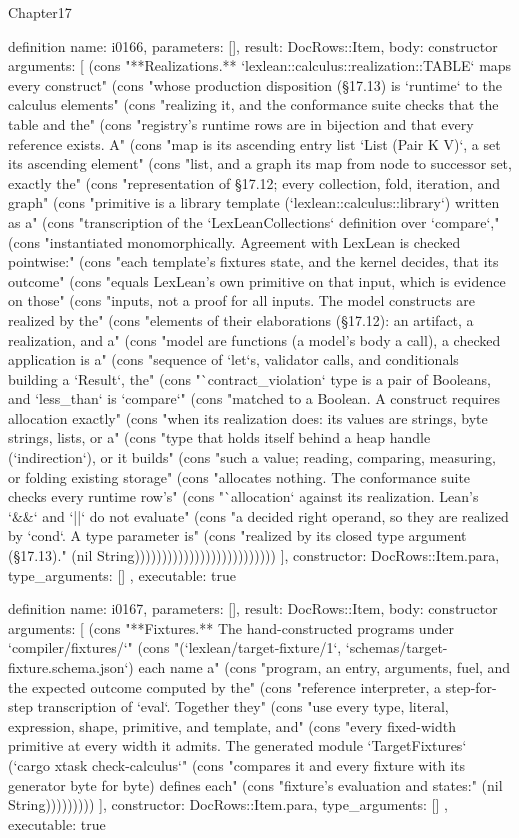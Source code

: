 \begin{lexlean}{Chapter17}
\begin{semanticmodule}
definition{
  name: i0166,
  parameters: [],
  result: DocRows::Item,
  body: constructor{
    arguments: [
      (cons "**Realizations.** `lexlean::calculus::realization::TABLE` maps every construct" (cons "whose production disposition (§17.13) is `runtime` to the calculus elements" (cons "realizing it, and the conformance suite checks that the table and the" (cons "registry's runtime rows are in bijection and that every reference exists. A" (cons "map is its ascending entry list `List (Pair K V)`, a set its ascending element" (cons "list, and a graph its map from node to successor set, exactly the" (cons "representation of §17.12; every collection, fold, iteration, and graph" (cons "primitive is a library template (`lexlean::calculus::library`) written as a" (cons "transcription of the `LexLeanCollections` definition over `compare`," (cons "instantiated monomorphically. Agreement with LexLean is checked pointwise:" (cons "each template's fixtures state, and the kernel decides, that its outcome" (cons "equals LexLean's own primitive on that input, which is evidence on those" (cons "inputs, not a proof for all inputs. The model constructs are realized by the" (cons "elements of their elaborations (§17.12): an artifact, a realization, and a" (cons "model are functions (a model's body a call), a checked application is a" (cons "sequence of `let`s, validator calls, and conditionals building a `Result`, the" (cons "`contract_violation` type is a pair of Booleans, and `less_than` is `compare`" (cons "matched to a Boolean. A construct requires allocation exactly" (cons "when its realization does: its values are strings, byte strings, lists, or a" (cons "type that holds itself behind a heap handle (`indirection`), or it builds" (cons "such a value; reading, comparing, measuring, or folding existing storage" (cons "allocates nothing. The conformance suite checks every runtime row's" (cons "`allocation` against its realization. Lean's `&&` and `||` do not evaluate" (cons "a decided right operand, so they are realized by `cond`. A type parameter is" (cons "realized by its closed type argument (§17.13)." (nil String))))))))))))))))))))))))))
    ],
    constructor: DocRows::Item.para,
    type_arguments: []
  },
  executable: true
}

definition{
  name: i0167,
  parameters: [],
  result: DocRows::Item,
  body: constructor{
    arguments: [
      (cons "**Fixtures.** The hand-constructed programs under `compiler/fixtures/`" (cons "(`lexlean/target-fixture/1`, `schemas/target-fixture.schema.json`) each name a" (cons "program, an entry, arguments, fuel, and the expected outcome computed by the" (cons "reference interpreter, a step-for-step transcription of `eval`. Together they" (cons "use every type, literal, expression, shape, primitive, and template, and" (cons "every fixed-width primitive at every width it admits. The generated module `TargetFixtures` (`cargo xtask check-calculus`" (cons "compares it and every fixture with its generator byte for byte) defines each" (cons "fixture's evaluation and states:" (nil String)))))))))
    ],
    constructor: DocRows::Item.para,
    type_arguments: []
  },
  executable: true
}


\end{semanticmodule}
\end{lexlean}
